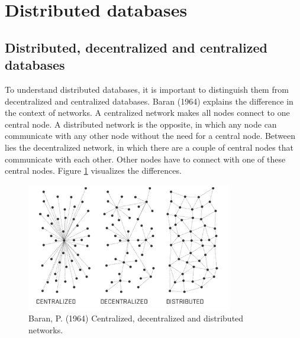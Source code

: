 \section{Distributed databases}
\label{sec:distributed-dbs}

\subsection{Distributed, decentralized and centralized databases}

To understand distributed databases, it is important to distinguish them from decentralized and centralized databases. Baran (1964) \cite{baran-distributed-communications} explains the difference in the context of networks. A centralized network makes all nodes connect to one central node. A distributed network is the opposite, in which any node can communicate with any other node without the need for a central node. Between lies the decentralized network, in which there are a couple of central nodes that communicate with each other. Other nodes have to connect with one of these central nodes.
Figure \ref{fig:baran-networks} visualizes the differences.

\begin{figure}[h]
\centering
\includegraphics[width=0.8\textwidth]{paper-images/baran_networks.png}
\caption{Baran, P. (1964) Centralized, decentralized and distributed networks.} 
\label{fig:baran-networks}
\end{figure} 

